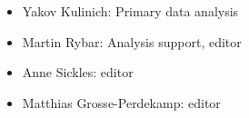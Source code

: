 \begin{itemize}
\item Yakov Kulinich: Primary data analysis
\item Martin Rybar: Analysis support, editor
\item Anne Sickles: editor
\item Matthias Grosse-Perdekamp: editor
\end{itemize}
